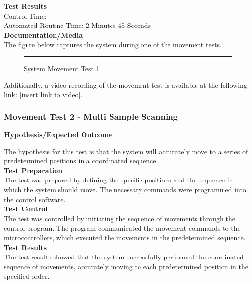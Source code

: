 \documentclass{UoNMCHA}
\numberwithin{equation}{section}
\begin{document}
\textbf{Test Results}\\

Control Time:  \\
Automated Routine Time:  2 Minutes 45 Seconds\\

\textbf{Documentation/Media}\\

The figure below captures the system during one of the movement tests.\\

\begin{figure}[h]
	\centering
	\rule{0.5\textwidth}{0.5\textwidth}%
	\caption{System Movement Test 1}
	\label{fig:System Movement Test 1}
\end{figure}

Additionally, a video recording of the movement test is available at the following link: [insert link to video].\\

\subsubsection{Movement Test 2 - Multi Sample Scanning}\label{subsub:Movement Test 2}
\textbf{Hypothesis/Expected Outcome}

The hypothesis for this test is that the system will accurately move to a series of predetermined positions in a coordinated sequence.\\

\textbf{Test Preparation}\\

The test was prepared by defining the specific positions and the sequence in which the system should move. The necessary commands were programmed into the control software.\\

\textbf{Test Control}\\

The test was controlled by initiating the sequence of movements through the control program. The program communicated the movement commands to the microcontrollers, which executed the movements in the predetermined sequence.\\

\textbf{Test Results}\\

The test results showed that the system successfully performed the coordinated sequence of movements, accurately moving to each predetermined position in the specified order.\\
\end{document}
